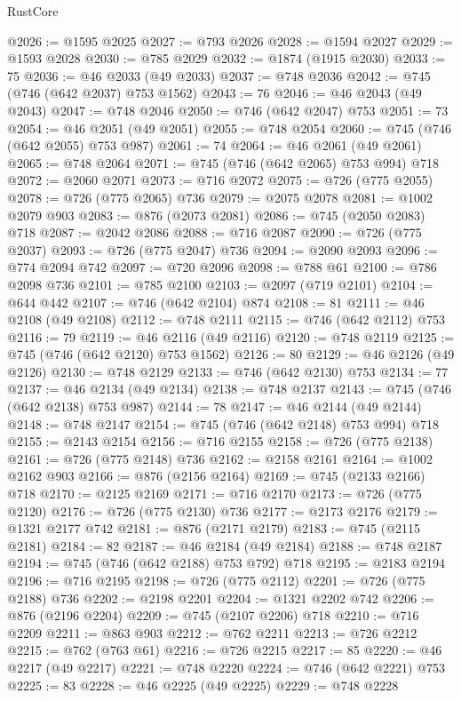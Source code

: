 \begin{lexlean}{RustCore}
\begin{coremodule}
@2026 := @1595 @2025
@2027 := @793 @2026
@2028 := @1594 @2027
@2029 := @1593 @2028
@2030 := @785 @2029
@2032 := @1874 (@1915 @2030)
@2033 := 75
@2036 := @46 @2033 (@49 @2033)
@2037 := @748 @2036
@2042 := @745 (@746 (@642 @2037) @753 @1562)
@2043 := 76
@2046 := @46 @2043 (@49 @2043)
@2047 := @748 @2046
@2050 := @746 (@642 @2047) @753
@2051 := 73
@2054 := @46 @2051 (@49 @2051)
@2055 := @748 @2054
@2060 := @745 (@746 (@642 @2055) @753 @987)
@2061 := 74
@2064 := @46 @2061 (@49 @2061)
@2065 := @748 @2064
@2071 := @745 (@746 (@642 @2065) @753 @994) @718
@2072 := @2060 @2071
@2073 := @716 @2072
@2075 := @726 (@775 @2055)
@2078 := @726 (@775 @2065) @736
@2079 := @2075 @2078
@2081 := @1002 @2079 @903
@2083 := @876 (@2073 @2081)
@2086 := @745 (@2050 @2083) @718
@2087 := @2042 @2086
@2088 := @716 @2087
@2090 := @726 (@775 @2037)
@2093 := @726 (@775 @2047) @736
@2094 := @2090 @2093
@2096 := @774 @2094 @742
@2097 := @720 @2096
@2098 := @788 @61
@2100 := @786 @2098 @736
@2101 := @785 @2100
@2103 := @2097 (@719 @2101)
@2104 := @644 @442
@2107 := @746 (@642 @2104) @874
@2108 := 81
@2111 := @46 @2108 (@49 @2108)
@2112 := @748 @2111
@2115 := @746 (@642 @2112) @753
@2116 := 79
@2119 := @46 @2116 (@49 @2116)
@2120 := @748 @2119
@2125 := @745 (@746 (@642 @2120) @753 @1562)
@2126 := 80
@2129 := @46 @2126 (@49 @2126)
@2130 := @748 @2129
@2133 := @746 (@642 @2130) @753
@2134 := 77
@2137 := @46 @2134 (@49 @2134)
@2138 := @748 @2137
@2143 := @745 (@746 (@642 @2138) @753 @987)
@2144 := 78
@2147 := @46 @2144 (@49 @2144)
@2148 := @748 @2147
@2154 := @745 (@746 (@642 @2148) @753 @994) @718
@2155 := @2143 @2154
@2156 := @716 @2155
@2158 := @726 (@775 @2138)
@2161 := @726 (@775 @2148) @736
@2162 := @2158 @2161
@2164 := @1002 @2162 @903
@2166 := @876 (@2156 @2164)
@2169 := @745 (@2133 @2166) @718
@2170 := @2125 @2169
@2171 := @716 @2170
@2173 := @726 (@775 @2120)
@2176 := @726 (@775 @2130) @736
@2177 := @2173 @2176
@2179 := @1321 @2177 @742
@2181 := @876 (@2171 @2179)
@2183 := @745 (@2115 @2181)
@2184 := 82
@2187 := @46 @2184 (@49 @2184)
@2188 := @748 @2187
@2194 := @745 (@746 (@642 @2188) @753 @792) @718
@2195 := @2183 @2194
@2196 := @716 @2195
@2198 := @726 (@775 @2112)
@2201 := @726 (@775 @2188) @736
@2202 := @2198 @2201
@2204 := @1321 @2202 @742
@2206 := @876 (@2196 @2204)
@2209 := @745 (@2107 @2206) @718
@2210 := @716 @2209
@2211 := @863 @903
@2212 := @762 @2211
@2213 := @726 @2212
@2215 := @762 (@763 @61)
@2216 := @726 @2215
@2217 := 85
@2220 := @46 @2217 (@49 @2217)
@2221 := @748 @2220
@2224 := @746 (@642 @2221) @753
@2225 := 83
@2228 := @46 @2225 (@49 @2225)
@2229 := @748 @2228

\end{coremodule}
\end{lexlean}

